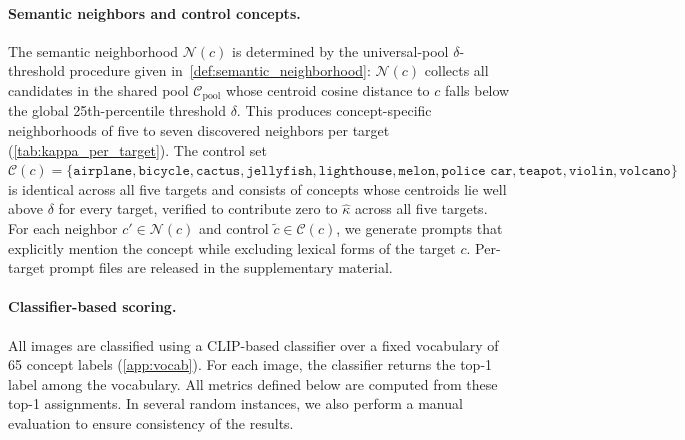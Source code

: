 \paragraph{Semantic neighbors and control concepts.}
The semantic neighborhood $\mathcal{N}(c)$ is determined by the universal-pool $\delta$-threshold procedure given in~\cref{def:semantic_neighborhood}: $\mathcal{N}(c)$ collects all candidates in the shared pool $\mathcal{C}_{\mathrm{pool}}$ whose centroid cosine distance to $c$ falls below the global 25th-percentile threshold $\delta$. This produces concept-specific neighborhoods of five to seven discovered neighbors per target (\cref{tab:kappa_per_target}).
The control set $\mathcal{C}(c) = \{\texttt{airplane}, \texttt{bicycle}, \texttt{cactus}, \texttt{jellyfish}, \texttt{lighthouse}, \texttt{melon}, \texttt{police car}, \texttt{teapot}, \texttt{violin}, \texttt{volcano}\}$ is identical across all five targets and consists of concepts whose centroids lie well above $\delta$ for every target, verified to contribute zero to $\hat\kappa$ across all five targets. For each neighbor $c' \in \mathcal{N}(c)$ and control $\tilde c \in \mathcal{C}(c)$, we generate prompts that explicitly mention the concept while excluding lexical forms of the target $c$. Per-target prompt files are released in the supplementary material.

\paragraph{Classifier-based scoring.}
All images are classified using a CLIP-based classifier over a fixed vocabulary of 65 concept labels (\cref{app:vocab}). For each image, the classifier returns the top-1 label among the vocabulary. All metrics defined below are computed from these top-1 assignments. In several random instances, we also perform a manual evaluation to ensure consistency of the results.


